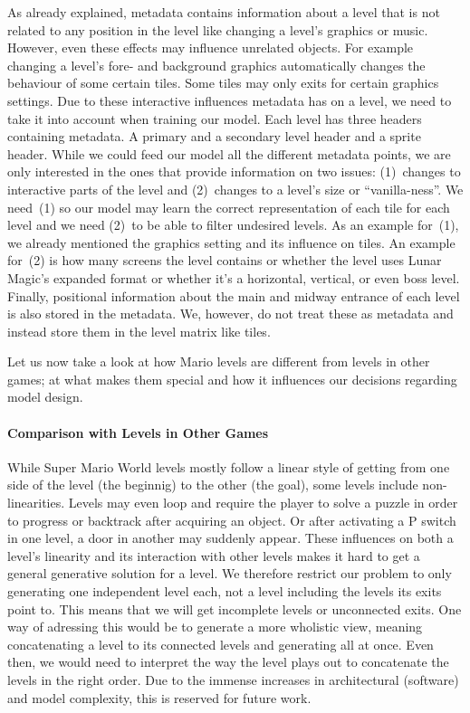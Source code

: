 As already explained, metadata contains information about a level that
is not related to any position in the level like changing a level's
graphics or music. However, even these effects may influence unrelated
objects. For example changing a level's fore- and background graphics
automatically changes the behaviour of some certain tiles. Some tiles
may only exits for certain graphics settings. Due to these interactive
influences metadata has on a level, we need to take it into account
when training our model. Each level has three headers containing
metadata. A primary and a secondary level header and a sprite header.
While we could feed our model all the different metadata points, we
are only interested in the ones that provide information on two
issues: (1)~changes to interactive parts of the level and (2)~changes
to a level's size or ``vanilla-ness''. We need~(1) so our model may
learn the correct representation of each tile for each level and we
need (2)~to be able to filter undesired levels. As an example for~(1),
we already mentioned the graphics setting and its influence on tiles.
An example for~(2) is how many screens the level contains or whether
the level uses Lunar Magic's expanded format or whether it's a
horizontal, vertical, or even boss level. \\
Finally, positional information about the main and midway entrance of
each level is also stored in the metadata. We, however, do not treat
these as metadata and instead store them in the level matrix like
tiles.

Let us now take a look at how Mario levels are different from levels
in other games; at what makes them special and how it influences our
decisions regarding model design.

\paragraph{Comparison with Levels in Other Games}

While Super Mario World levels mostly follow a linear style of getting
from one side of the level (the beginnig) to the other (the goal),
some levels include non-linearities. Levels may even loop and require
the player to solve a puzzle in order to progress or backtrack after
acquiring an object. Or after activating a P switch in one level, a
door in another may suddenly appear. These influences on both a
level's linearity and its interaction with other levels makes it hard
to get a general generative solution for a level. We therefore
restrict our problem to only generating one independent level each,
not a level including the levels its exits point to. This means that
we will get incomplete levels or unconnected exits. One way of
adressing this would be to generate a more wholistic view, meaning
concatenating a level to its connected levels and generating all at
once. Even then, we would need to interpret the way the level plays
out to concatenate the levels in the right order. Due to the immense
increases in architectural (software) and model complexity, this is
reserved for future work.

